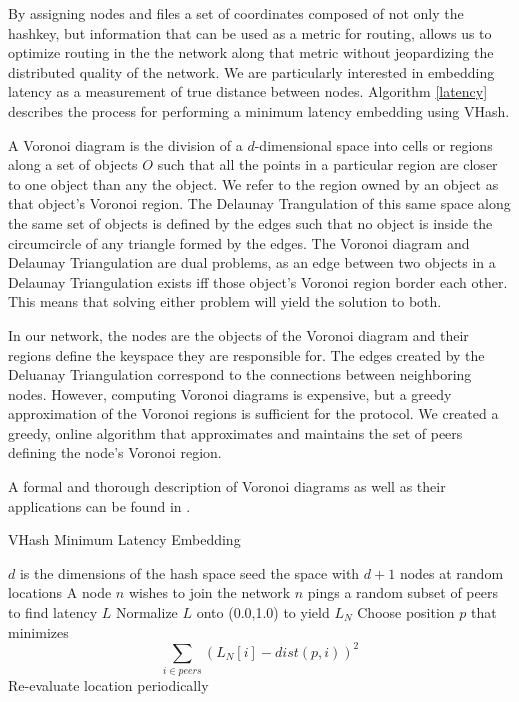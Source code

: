 \documentclass{IEEEtran}
\begin{document}
By assigning nodes and files a set of coordinates composed of not only the hashkey, but information that can be used as a metric for routing,  allows us to optimize routing in the the network along that metric without jeopardizing the distributed quality of the network.  We are particularly interested in embedding latency as a measurement of true distance between nodes.  Algorithm \ref{latency} describes the process for performing a minimum latency embedding using VHash.


A Voronoi diagram is the division of a $d$-dimensional space into cells or regions along a set of objects $O$ such that all the points in a particular region are closer to one object than any the object.  
We refer to the region owned by an object as that object's Voronoi region.
The Delaunay Trangulation of this same space along the same set of objects is defined by the edges such that no object is inside the circumcircle of any triangle formed by the edges\cite{geoalg}.  
The Voronoi diagram and Delaunay Triangulation are dual problems, as an edge between two objects in a Delaunay Triangulation exists iff those object's Voronoi region border each other.  
This means that solving either problem will yield the solution to both. 

In our network, the nodes are the objects of the Voronoi diagram and their regions define the keyspace they are responsible for.  The edges created by the Deluanay Triangulation correspond to the connections between neighboring nodes.  However, computing Voronoi diagrams is expensive, but a greedy approximation of the Voronoi regions is sufficient for the protocol.  We created a greedy, online algorithm that approximates and maintains the set of peers defining the node's Voronoi region.

A formal and thorough description of Voronoi diagrams as well as their applications can be found in \cite{aurenhammer1991voronoi}.





\begin{algorithm}
\caption{VHash Minimum Latency Embedding}
\label{latency}
\begin{algorithmic}[1]  %
	\STATE $d$ is the dimensions of the hash space
    \STATE seed the space with $d+1$ nodes at random locations
   	\STATE A node $n$ wishes to join the network
    \STATE $n$ pings a random subset of peers to find latency $L$
    \STATE Normalize $L$ onto (0.0,1.0) to yield $L_N$
    \STATE Choose position $p$ that minimizes $$\sum\limits_{i\in peers}(L_N[i]-dist(p,i))^2$$ 
    \STATE Re-evaluate location periodically
\end{algorithmic}
\end{algorithm}
\end{document}
